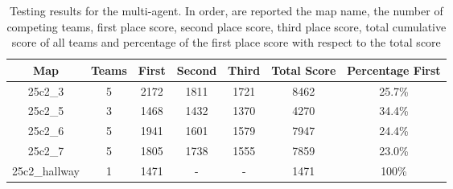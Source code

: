 \begin{table}[H]
    \centering
    \begin{tabular}{|c|c|c|c|c|c|c|}
        \hline
        Map & Teams & First & Second & Third & Total Score & Percentage First \\
        \hline
        25c2\_3         & 5  & 2172   & 1811  & 1721  & 8462  & 25.7\% \\
        25c2\_5         & 3  & 1468   & 1432  & 1370  & 4270  & 34.4\% \\
        25c2\_6         & 5  & 1941   & 1601  & 1579  & 7947  & 24.4\% \\
        25c2\_7         & 5  & 1805   & 1738  & 1555  & 7859  & 23.0\% \\
        25c2\_hallway   & 1  & 1471   & -     & -     & 1471   & 100\% \\
        \hline
    \end{tabular}
    \caption{Testing results for the multi-agent. In order, are reported the map name, the number of competing teams, first place score, second place score, third place score, total cumulative score of all teams and percentage of the first place score with respect to the total score}
    \label{tab:table_2}
\end{table}

